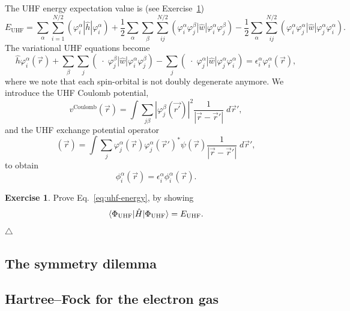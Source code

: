 \documentclass{report}
\theoremstyle{plain}
\theoremstyle{definition}
\newtheorem{exerc}{Exercise}[chapter]
\newcommand\xqed[1]{%
  \leavevmode\unskip\penalty9999 \hbox{}\nobreak\hfill
  \quad\hbox{#1}}
\newcommand\demo{\xqed{$\triangle$}}
\newenvironment{exercise}{\bigskip\begin{exerc}}{\demo\end{exerc}\bigskip}
\begin{document}
The UHF energy expectation value is (see Exercise~\ref{exercise:uhf-energy})
\begin{equation}
  E_\text{UHF} = \sum_\alpha \sum_{i=1}^{N/2}
  (\varphi_i^\alpha|\hat{h}|\varphi_i^\alpha) + \frac{1}{2}
  \sum_\alpha\sum_\beta\sum_{ij}^{N/2}
  (\varphi_i^\alpha\varphi_j^\beta|\hat{w}|\varphi_i^\alpha\varphi_j^\beta)
  - \frac{1}{2} \sum_\alpha \sum_{ij}^{N/2}
  (\varphi_i^\alpha\varphi_j^\alpha|\hat{w}|\varphi_j^\alpha\varphi_i^\alpha) \label{eq:uhf-energy}.
\end{equation}
The variational UHF equations become
\begin{equation}
  \hat{h}\varphi_i^\alpha(\vec{r}) + \sum_\beta \sum_j
  (\;\cdot\;\varphi_j^\beta|\hat{w}|\varphi_i^\alpha \varphi_j^\beta)
  - \sum_j
  (\;\cdot\;\varphi_j^\alpha|\hat{w}|\varphi_j^\alpha\varphi_i^\alpha)
  = \epsilon_i^\alpha \varphi_i^\alpha(\vec{r}),
\end{equation}
where we note that each spin-orbital is not doubly degenerate anymore.
We introduce the UHF Coulomb potential,
\begin{equation}
  {v}^\text{Coulomb}(\vec{r}) = \int \sum_{j\beta}
  |\varphi_j^\beta(\vec{r'})|^2 \frac{1}{|\vec{r}-\vec{r}'|} \;
  d\vec{r}',
\end{equation}
and the UHF exchange potential operator
\begin{equation}
  [\hat{v}^{\alpha,\text{exchange}}\psi](\vec{r}) = \int \sum_{j}
  \varphi_j^\alpha(\vec{r})\varphi_j^\alpha(\vec{r}')^* \psi(\vec{r}) \frac{1}{|\vec{r}-\vec{r}'|} \;  d\vec{r}',
\end{equation}
to obtain 
\begin{equation}
  [\hat{h} + \hat{v}^\text{Coulomb} -
  \hat{v}^{\alpha,\text{exchange}}]\phi_i^\alpha(\vec{r}) =
  \epsilon_i^\alpha \phi_i^\alpha(\vec{r}).
\end{equation}

\begin{exercise}\label{exercise:uhf-energy}
  Prove Eq.~\eqref{eq:uhf-energy}, by showing
  \begin{equation}
    \braket{\Phi_\text{UHF}|\hat{H}|\Phi_\text{UHF}} = E_\text{UHF}.
  \end{equation}
\end{exercise}

\subsection{The symmetry dilemma}

\subsection{Hartree--Fock for the electron gas}
\end{document}
